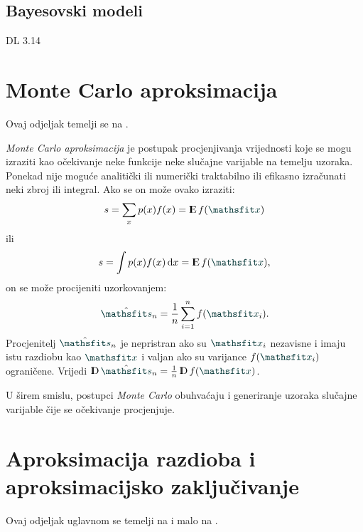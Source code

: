 \documentclass[utf8, diplomski, lmodern]{fer}
\begin{document}
\subsection{Bayesovski modeli}

DL 3.14

\section{Monte Carlo aproksimacija}

Ovaj odjeljak temelji se na \cite{Goodfellow:2016:DL}.

\emph{Monte Carlo aproksimacija} je postupak procjenjivanja vrijednosti koje se mogu izraziti kao očekivanje neke funkcije neke slučajne varijable na temelju uzoraka. Ponekad nije moguće analitički ili numerički traktabilno ili efikasno izračunati neki zbroj ili integral. Ako se on može ovako izraziti:
\begin{align}
s = \sum_x p(x)f(x) = \E f(\rvar x)
\end{align}
ili
\begin{align}
s = \int p(x)f(x)\dif x= \E f(\rvar x),
\end{align}
on se može procijeniti uzorkovanjem:
\begin{align}
\hat{\rvar s}_n = \frac{1}{n}\sum_{i=1}^n f(\rvar x_i).
\end{align}
Procjenitelj $\hat{\rvar s}_n$ je nepristran ako su $\rvar x_i$ nezavisne i imaju istu razdiobu kao $\rvar x$ i valjan ako su varijance $f(\rvar x_i)$ ograničene. Vrijedi $\D\hat{\rvar s}_n = \frac{1}{n} \D f(\rvar x)$.


U širem smislu, postupci \textit{Monte Carlo} obuhvaćaju i generiranje uzoraka slučajne varijable čije se očekivanje procjenjuje.



\section{Aproksimacija razdioba i aproksimacijsko zaključivanje}

Ovaj odjeljak uglavnom se temelji na \citet{Blei:2017:VIRS} i malo na \citet{Yang:2017:UVLB}.
\end{document}
